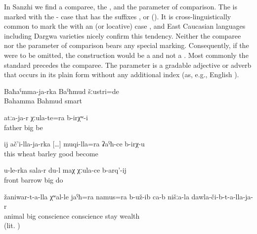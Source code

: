 In Sanzhi  we find a comparee, the , and the parameter of comparison. The  is marked with the - case that has the suffixes ,  or  (). It is cross-linguistically common to mark the  with an  (or locative) case \citep[791]{Dixon2008}, and East Caucasian languages including Dargwa varieties nicely confirm this tendency. Neither the comparee nor the parameter of comparison bears any special marking. Consequently, if the  were to be omitted, the construction would be a  and not a . Most commonly the standard precedes the comparee. The parameter is a gradable adjective or adverb that occurs in its plain form without any additional index (as, e.g., English ).
%
\begin{exe}
	\ex	\label{ex:‎Bahmud was smarter than Bahamma}
	\gll	Baħaˁmma-ja-rka	Baˁħmud	šːustri=de	\\
		Bahamma	Bahmud	smart\\
	\glt	{}

	\ex	\label{ex:‎‎There were those older than father}
	\gll	atːa-ja-r	χːula-te=ra	b-irχʷ-i\\
		father	big be\\
	\glt	{}

	\ex	\label{ex:‎‎It (bread) is better (when made) of barley than of wheat.}
	\gll	ij	ač'i-lla-ja-rka	[\ldots]	muqi-lla=ra	ʡaˁħ-ce	b-irχ-u	\\
		this	wheat	{} barley	good	become\\
	\glt	{}

	\ex	\label{ex:‎I (will) make a big barrow (maχ) earlier than you}
	\gll	u-le-rka	sala-r	du-l	maχ	χːula-ce	b-arq'-ij\\
			front		barrow	big	do	\\
	\glt	{}

	\ex	\label{ex:‎‎‎The animals had apparently more conscience than our rich (people)}
	\gll	žaniwar-t-a-lla	χʷal-le	jaˁħ=ra		namus=ra	b-už-ib	ca-b	nišːa-la	dawla-či-b-t-a-lla-ja-r	\\
		animal	big	conscience	conscience	stay			wealth\\
	\glt	{} (lit. )
\end{exe}

